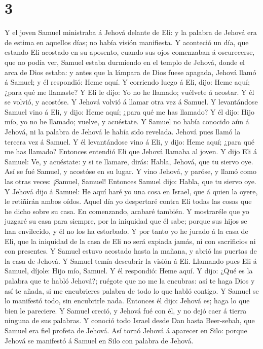 \hypertarget{section-2}{%
\section{3}\label{section-2}}

 Y el joven Samuel ministraba á Jehová delante de Eli: y la
palabra de Jehová era de estima en aquellos días; no había visión
manifiesta.  Y aconteció un día, que estando Eli acostado en
su aposento, cuando sus ojos comenzaban á oscurecerse, que no podía ver,
 Samuel estaba durmiendo en el templo de Jehová, donde el
arca de Dios estaba: y antes que la lámpara de Dios fuese apagada,
 Jehová llamó á Samuel; y él respondió: Heme aquí.
 Y corriendo luego á Eli, dijo: Heme aquí; ¿para qué me
llamaste? Y Eli le dijo: Yo no he llamado; vuélvete á acostar. Y él se
volvió, y acostóse.  Y Jehová volvió á llamar otra vez á
Samuel. Y levantándose Samuel vino á Eli, y dijo: Heme aquí; ¿para qué
me has llamado? Y él dijo: Hijo mío, yo no he llamado; vuelve, y
acuéstate.  Y Samuel no había conocido aún á Jehová, ni la
palabra de Jehová le había sido revelada.  Jehová pues llamó
la tercera vez á Samuel. Y él levantándose vino á Eli, y dijo: Heme
aquí; ¿para qué me has llamado? Entonces entendió Eli que Jehová llamaba
al joven.  Y dijo Eli á Samuel: Ve, y acuéstate: y si te
llamare, dirás: Habla, Jehová, que tu siervo oye. Así se fué Samuel, y
acostóse en su lugar.  Y vino Jehová, y paróse, y llamó
como las otras veces: ¡Samuel, Samuel! Entonces Samuel dijo: Habla, que
tu siervo oye.  Y Jehová dijo á Samuel: He aquí haré yo una
cosa en Israel, que á quien la oyere, le retiñirán ambos oídos.
 Aquel día yo despertaré contra Eli todas las cosas que he
dicho sobre su casa. En comenzando, acabaré también.  Y
mostraréle que yo juzgaré su casa para siempre, por la iniquidad que él
sabe; porque sus hijos se han envilecido, y él no los ha estorbado.
 Y por tanto yo he jurado á la casa de Eli, que la
iniquidad de la casa de Eli no será expiada jamás, ni con sacrificios ni
con presentes.  Y Samuel estuvo acostado hasta la mañana, y
abrió las puertas de la casa de Jehová. Y Samuel temía descubrir la
visión á Eli.  Llamando pues Eli á Samuel, díjole: Hijo
mío, Samuel. Y él respondió: Heme aquí.  Y dijo: ¿Qué es la
palabra que te habló Jehová?; ruégote que no me la encubras: así te haga
Dios y así te añada, si me encubrieres palabra de todo lo que habló
contigo.  Y Samuel se lo manifestó todo, sin encubrirle
nada. Entonces él dijo: Jehová es; haga lo que bien le pareciere.
 Y Samuel creció, y Jehová fué con él, y no dejó caer á
tierra ninguna de sus palabras.  Y conoció todo Israel
desde Dan hasta Beer-sebah, que Samuel era fiel profeta de Jehová.
 Así tornó Jehová á aparecer en Silo: porque Jehová se
manifestó á Samuel en Silo con palabra de Jehová.

